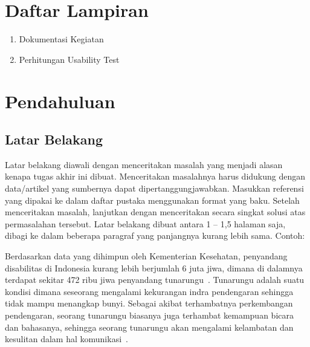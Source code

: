 \documentclass[a4paper,11pt,oneside]{report}
\begin{document}
\tableofcontents
\listoffigures
\listoftables

\chapter*{Daftar Lampiran}
\begin{enumerate}[label=Lampiran \arabic*.,leftmargin=*]
    \item Dokumentasi Kegiatan
    \item Perhitungan Usability Test
\end{enumerate}

\clearpage
{}
\setcounter{page}{1}
\chapter{Pendahuluan}

\section{Latar Belakang}
Latar belakang diawali dengan menceritakan masalah yang menjadi alasan kenapa
tugas akhir ini dibuat. Menceritakan masalahnya harus didukung dengan
data/artikel yang sumbernya dapat dipertanggungjawabkan. Masukkan referensi yang
dipakai ke dalam daftar pustaka menggunakan format yang baku. Setelah
menceritakan masalah, lanjutkan dengan menceritakan secara singkat solusi atas
permasalahan tersebut. Latar belakang dibuat antara 1 -- 1,5 halaman saja, dibagi
ke dalam beberapa paragraf yang panjangnya kurang lebih sama. Contoh:

Berdasarkan data yang dihimpun oleh Kementerian Kesehatan, penyandang
disabilitas di Indonesia kurang lebih berjumlah 6 juta jiwa, dimana di dalamnya
terdapat sekitar 472 ribu jiwa penyandang tunarungu~\cite{ref1}. Tunarungu adalah
suatu kondisi dimana seseorang mengalami kekurangan indra pendengaran sehingga
tidak mampu menangkap bunyi. Sebagai akibat terhambatnya perkembangan pendengaran,
seorang tunarungu biasanya juga terhambat kemampuan bicara dan bahasanya,
sehingga seorang tunarungu akan mengalami kelambatan dan kesulitan dalam hal
komunikasi~\cite{ref2}.
\end{document}
